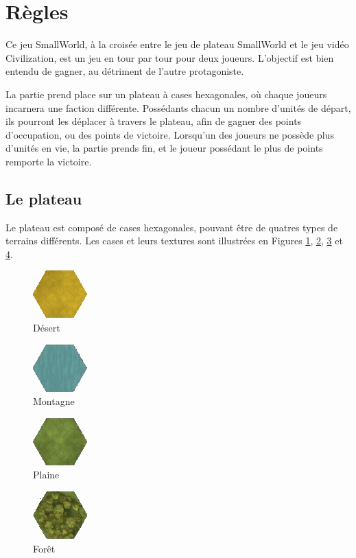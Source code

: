 \section{Règles}
\label{section:regles}
	Ce jeu SmallWorld, à la croisée entre le jeu de plateau SmallWorld et le jeu vidéo Civilization, est un jeu en tour par tour pour deux joueurs.
	L'objectif est bien entendu de gagner, au détriment de l'autre protagoniste. 

	La partie prend place sur un plateau à cases hexagonales, où chaque joueurs incarnera une faction différente.
	Possédants chacun un nombre d'unités de départ, ils pourront les déplacer à travers le plateau, afin de gagner des points d'occupation, ou des points de victoire.
	Lorsqu'un des joueurs ne possède plus d'unités en vie, la partie prends fin, et le joueur possédant le plus de points remporte la victoire.

	\subsection{Le plateau}
		Le plateau est composé de cases hexagonales, pouvant être de quatres types de terrains différents. Les cases et leurs textures sont illustrées en Figures \ref{fig:desert}, \ref{fig:moutain}, \ref{fig:field} et \ref{fig:forest}.

		\begin{figure}[h!]
			\centering
			\includegraphics{figure/desert.png}
			\caption{Désert}
			\label{fig:desert}
		\end{figure}
		\begin{figure}[h!]
			\centering
			\includegraphics{figure/moutain.png}
			\caption{Montagne}
			\label{fig:moutain}
		\end{figure}
		\begin{figure}[h!]
			\centering
			\includegraphics{figure/field.png}
			\caption{Plaine}
			\label{fig:field}
		\end{figure}
		\begin{figure}[h!]
			\centering
			\includegraphics{figure/forest.png}
			\caption{Forêt}
			\label{fig:forest}
		\end{figure}

